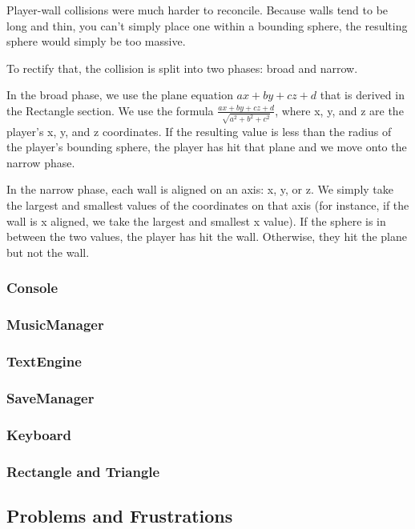 \documentclass{article}
\begin{document}
Player-wall collisions were much harder to reconcile. Because walls tend to be long and thin, you can't simply place one within a bounding sphere, the resulting sphere would simply be too massive.

To rectify that, the collision is split into two phases: broad and narrow.

In the broad phase, we use the plane equation $ax + by + cz + d$ that is derived in the Rectangle section. We use the formula $\frac{ax + by + cz + d}{\sqrt{a^2 + b^2 + c^2}}$, where x, y, and z are the player's x, y, and z coordinates. If the resulting value is less than the radius of the player's bounding sphere, the player has hit that plane and we move onto the narrow phase.

In the narrow phase, each wall is aligned on an axis: x, y, or z. We simply take the largest and smallest values of the coordinates on that axis (for instance, if the wall is x aligned, we take the largest and smallest x value). If the sphere is in between the two values, the player has hit the wall. Otherwise, they hit the plane but not the wall.

\subsubsection{Console}

\subsubsection{MusicManager}

\subsubsection{TextEngine}

\subsubsection{SaveManager}

\subsubsection{Keyboard}

\subsubsection{Rectangle and Triangle}

\subsection{Problems and Frustrations}
\end{document}
